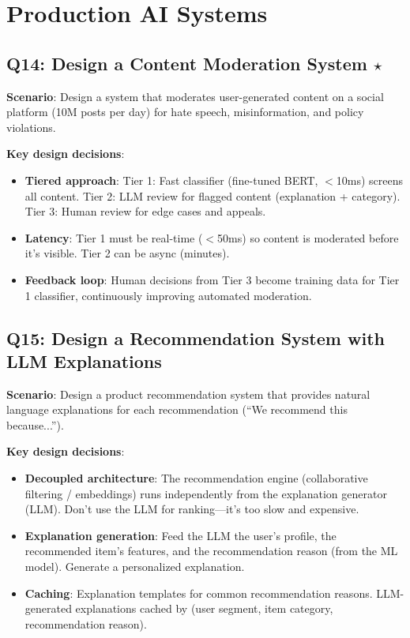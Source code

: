 \section{Production AI Systems}

\subsection{Q14: Design a Content Moderation System $\star$}

\textbf{Scenario}: Design a system that moderates user-generated content on a social platform (10M posts per day) for hate speech, misinformation, and policy violations.

\textbf{Key design decisions}:
\begin{itemize}[leftmargin=*]
    \item \textbf{Tiered approach}: Tier 1: Fast classifier (fine-tuned BERT, $<$10ms) screens all content. Tier 2: LLM review for flagged content (explanation + category). Tier 3: Human review for edge cases and appeals.
    \item \textbf{Latency}: Tier 1 must be real-time ($<$50ms) so content is moderated before it's visible. Tier 2 can be async (minutes).
    \item \textbf{Feedback loop}: Human decisions from Tier 3 become training data for Tier 1 classifier, continuously improving automated moderation.
\end{itemize}

\subsection{Q15: Design a Recommendation System with LLM Explanations}

\textbf{Scenario}: Design a product recommendation system that provides natural language explanations for each recommendation (``We recommend this because...'').

\textbf{Key design decisions}:
\begin{itemize}[leftmargin=*]
    \item \textbf{Decoupled architecture}: The recommendation engine (collaborative filtering / embeddings) runs independently from the explanation generator (LLM). Don't use the LLM for ranking---it's too slow and expensive.
    \item \textbf{Explanation generation}: Feed the LLM the user's profile, the recommended item's features, and the recommendation reason (from the ML model). Generate a personalized explanation.
    \item \textbf{Caching}: Explanation templates for common recommendation reasons. LLM-generated explanations cached by (user segment, item category, recommendation reason).
\end{itemize}


